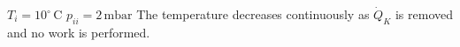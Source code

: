 \( T_i = 10^\circ \, \text{C} \)  
\( p_{ii} = 2 \, \text{mbar} \)  
The temperature decreases continuously as \( \dot{Q}_K \) is removed and no work is performed.